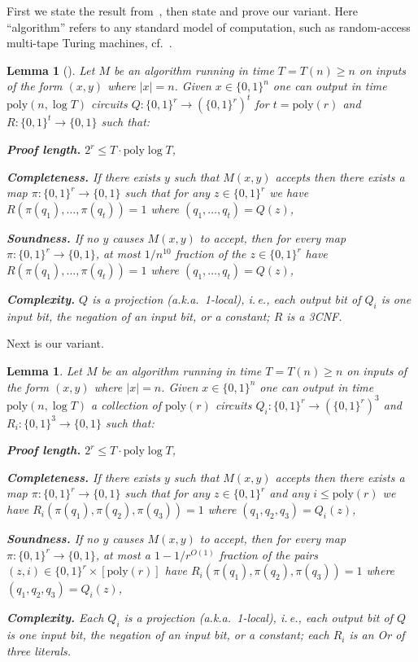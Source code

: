 \documentclass[11pt]{article}
\newcommand{\ie}{i.\,e.}
\newtheorem{lem}[theorem]{Lemma}  %
\newcommand{\zo}{\{0, 1\}}
\newcommand{\poly}{\mathrm{poly}}
\begin{document}
First we state the result from~\cite{Ben-SassonV-AC0PCP}, then state
and prove our variant. Here ``algorithm'' refers to any standard
model of computation, such as random-access multi-tape Turing machines,
cf.~\cite{Williams14-acc-jacm}.
\begin{lem}[{\cite{Ben-SassonV-AC0PCP}}] \label{lem:BV-PCP}Let $M$ be an algorithm
running in time $T=T(n)\geq n$ on inputs of the form $(x,y)$ where
$|x|=n$. Given $x\in\{0,1\}^{n}$ one can output in time $\poly(n,\log T)$
circuits $Q:\zo^{r}\to(\zo^{r})^{t}$ for $t=\poly(r)$ and $R:\zo^{t}\to\zo$
such that:

\textbf{Proof length.} $2^{r}\le T\cdot\poly\log T$,

\textbf{Completeness.} If there exists $y$ such that $M(x,y)$ accepts
then there exists a map $\pi:\zo^{r}\to\zo$ such that for any $z\in\zo^{r}$
we have $R(\pi(q_{1}),\ldots,\pi(q_{t}))=1$ where $(q_{1},\ldots,q_{t})=Q(z)$,

\textbf{Soundness.} If no $y$ causes $M(x,y)$ to accept, then for
every map $\pi:\zo^{r}\to\zo$, at most $1/n^{10}$ fraction of the
$z\in\zo^{r}$ have $R(\pi(q_{1}),\ldots,\pi(q_{t}))=1$ where $(q_{1},\ldots,q_{t})=Q(z)$,

\textbf{Complexity.} $Q$ is a projection (a.k.a.~1-local), \ie,
each output bit of $Q_{i}$ is one input bit, the negation of an input
bit, or a constant; $R$ is a 3CNF.
\end{lem}

Next is our variant.
\begin{lem}
\label{lem:NEW-PCP} Let $M$ be an algorithm running in time $T=T(n)\geq n$
on inputs of the form $(x,y)$ where $|x|=n$. Given $x\in\{0,1\}^{n}$
one can output in time $\poly(n,\log T)$ a collection of $\poly(r)$
circuits $Q_{i}:\zo^{r}\to(\zo^{r})^{3}$ and $R_{i}:\zo^{3}\to\zo$
such that:

\textbf{Proof length.} $2^{r}\le T\cdot\poly\log T$,

\textbf{Completeness.} If there exists $y$ such that $M(x,y)$ accepts
then there exists a map $\pi:\zo^{r}\to\zo$ such that for any $z\in\zo^{r}$
and any $i\le\poly(r)$ we have $R_{i}(\pi(q_{1}),\pi(q_{2}),\pi(q_{3}))=1$
where $(q_{1},q_{2},q_{3})=Q_{i}(z)$,

\textbf{Soundness.} If no $y$ causes $M(x,y)$ to accept, then for
every map $\pi:\zo^{r}\to\zo$, at most a $1-1/r^{O(1)}$ fraction
of the pairs $(z,i)\in\zo^{r}\times[\poly(r)]$ have $R_{i}(\pi(q_{1}),\pi(q_{2}),\pi(q_{3}))=1$
where $(q_{1},q_{2},q_{3})=Q_{i}(z)$,

\textbf{Complexity.} Each $Q_{i}$ is a projection (a.k.a.~1-local),
\ie, each output bit of $Q$ is one input bit, the negation of an
input bit, or a constant; each $R_{i}$ is an Or of three literals.
\end{lem}
\end{document}
